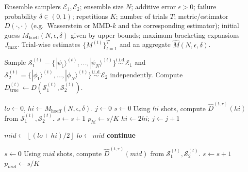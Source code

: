 \documentclass[aps,prx,reprint,superscriptaddress,amsmath,amssymb,longbibliography,floatfix]{revtex4-2}
\providecommand{\ket}[1]{|#1 \rangle}
\newcommand{\scE}{\mathcal{E}}
\newcommand{\scS}{\mathcal{S}}
\theoremstyle{plain}
\theoremstyle{definition}
\theoremstyle{remark}
\begin{document}
\begin{algorithm*}
\caption{Estimating the minimum sample $M(N,\epsilon,\delta)$ to estimate a distance metric between ensembles}
\label{alg:estimate-M}
\begin{algorithmic}

 Ensemble samplers $\scE_1,\scE_2$; ensemble size $N$; additive error $\epsilon>0$; failure probability $\delta\in(0,1)$; repetitions $K$; number of trials $T$; metric/estimator $D(\cdot,\cdot)$ (e.g.\ Wasserstein or MMD-$k$ and the corresponding estimator); initial guess $M_{\mathrm{hoeff}}(N,\epsilon,\delta)$ given by upper bounds; maximum bracketing expansions $J_{\max}$.
 Trial-wise estimates $\{M^{(t)}\}_{t=1}^T$ and an aggregate $\widehat{M}(N,\epsilon,\delta)$.

    \State Sample $\scS_1^{(t)}=\{\ket{\psi_1}^{(t)},\ldots,\ket{\psi_N}^{(t)}\}\overset{\mathrm{i.i.d.}}{\sim}\scE_1$
           and $\scS_2^{(t)}=\{\ket{\phi_1}^{(t)},\ldots,\ket{\phi_N}^{(t)}\}\overset{\mathrm{i.i.d.}}{\sim}\scE_2$ independently.
    \State Compute $D_{\mathrm{true}}^{(t)} \gets D(\scS_1^{(t)},\scS_2^{(t)})$.

    \State $lo \gets 0$, \;\; $hi \gets M_{\mathrm{hoeff}}(N,\epsilon,\delta)$.
    \State \hspace{0.2cm}{\bfseries (Robust bracketing to ensure $hi$ passes)}
    \State $j \gets 0$
    \Repeat
        \State $s \gets 0$
            \State Using $hi$ shots, compute $\widehat{D}^{(t,r)}(hi)$ from $\scS_1^{(t)},\scS_2^{(t)}$.
                \State $s \gets s+1$
            \EndIf
        \EndFor
        \State $p_{hi} \gets s/K$
            \State $hi \gets 2hi$; \;\; $j \gets j+1$
        \EndIf

    \State \hspace{0.2cm}{\bfseries (Bisection with the same stopping rule as the implementation)}
        \State $mid \gets \left\lfloor (lo + hi)/2 \right\rfloor$
            \State $lo \gets mid$
            \State \textbf{continue}
        \EndIf

        \State $s \gets 0$
            \State Using $mid$ shots, compute $\widehat{D}^{(t,r)}(mid)$ from $\scS_1^{(t)},\scS_2^{(t)}$.
                \State $s \gets s+1$
            \EndIf
        \EndFor
        \State $p_{mid} \gets s/K$


\end{algorithmic}
\end{algorithm*}
\end{document}
